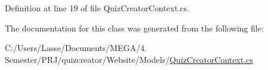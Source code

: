 Definition at line 19 of file Quiz\+Creator\+Context.\+cs.



The documentation for this class was generated from the following file\+:\begin{DoxyCompactItemize}
\item 
C\+:/\+Users/\+Lasse/\+Documents/\+M\+E\+G\+A/4. Semester/\+P\+R\+J/quizcreator/\+Website/\+Models/\hyperlink{_quiz_creator_context_8cs}{Quiz\+Creator\+Context.\+cs}\end{DoxyCompactItemize}
